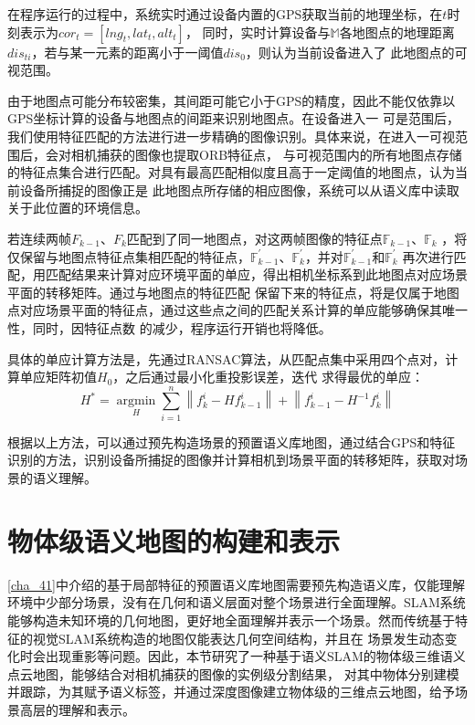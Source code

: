 在程序运行的过程中，系统实时通过设备内置的GPS获取当前的地理坐标，在$t$时刻表示为$cor_{t}=\left[lng_{t},lat_{t},alt_{t}\right]$，
同时，实时计算设备与$\mathbb{M}$各地图点的地理距离$dis_{ti}$，若与某一元素的距离小于一阈值$dis_{0}$，则认为当前设备进入了
此地图点的可视范围。

由于地图点可能分布较密集，其间距可能它小于GPS的精度，因此不能仅依靠以GPS坐标计算的设备与地图点的间距来识别地图点。在设备进入一
可是范围后，我们使用特征匹配的方法进行进一步精确的图像识别。具体来说，在进入一可视范围后，会对相机捕获的图像也提取ORB特征点，
与可视范围内的所有地图点存储的特征点集合进行匹配。对具有最高匹配相似度且高于一定阈值的地图点，认为当前设备所捕捉的图像正是
此地图点所存储的相应图像，系统可以从语义库中读取关于此位置的环境信息。

若连续两帧$F_{k-1}$、$F_{k}$匹配到了同一地图点，对这两帧图像的特征点$\mathbb{F}_{k-1}$、$\mathbb{F}_{k}$
，将仅保留与地图点特征点集相匹配的特征点，$\mathbb{F}_{k-1}^{'}$、$\mathbb{F}_{k}^{'}$，并对$\mathbb{F}_{k-1}^{'}$和$\mathbb{F}_{k}^{'}$
再次进行匹配，用匹配结果来计算对应环境平面的单应，得出相机坐标系到此地图点对应场景平面的转移矩阵。通过与地图点的特征匹配
保留下来的特征点，将是仅属于地图点对应场景平面的特征点，通过这些点之间的匹配关系计算的单应能够确保其唯一性，同时，因特征点数
的减少，程序运行开销也将降低。

具体的单应计算方法是，先通过RANSAC算法，从匹配点集中采用四个点对，计算单应矩阵初值$H_{0}$，之后通过最小化重投影误差，迭代
求得最优的单应：
$$H^{*}=\mathop{argmin}\limits_{H}\sum\limits_{i=1}^{n}\left \|f_{k}^{i}-Hf_{k-1}^{i} \right \|+\left \|f_{k-1}^{i}-H^{-1}f_{k}^{i} \right \|$$

根据以上方法，可以通过预先构造场景的预置语义库地图，通过结合GPS和特征识别的方法，识别设备所捕捉的图像并计算相机到场景平面的转移矩阵，获取对场景的语义理解。

\section{物体级语义地图的构建和表示}
\ref{cha_41}中介绍的基于局部特征的预置语义库地图需要预先构造语义库，仅能理解环境中少部分场景，没有在几何和语义层面对整个场景进行全面理解。SLAM系统
能够构造未知环境的几何地图，更好地全面理解并表示一个场景。然而传统基于特征的视觉SLAM系统构造的地图仅能表达几何空间结构，并且在
场景发生动态变化时会出现重影等问题。因此，本节研究了一种基于语义SLAM的物体级三维语义点云地图，能够结合对相机捕获的图像的实例级分割结果，
对其中物体分别建模并跟踪，为其赋予语义标签，并通过深度图像建立物体级的三维点云地图，给予场景高层的理解和表示。

